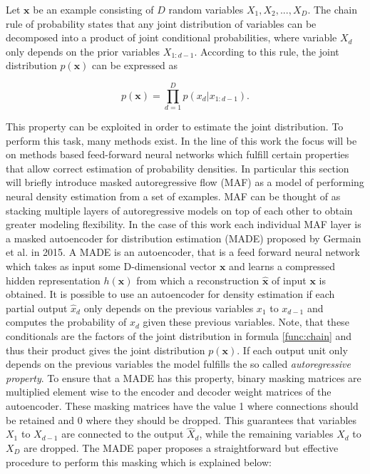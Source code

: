 \documentclass[11pt,titlepage,oneside,openany]{book}
\begin{document}
Let $\pmb{x}$ be an example consisting of $D$ random variables $X_1, X_2,...,X_D$. The chain rule of probability states that any joint distribution of variables can be decomposed into a product of joint conditional probabilities, where variable $X_d$ only depends on the prior variables $X_{1:d-1}$. According to this rule, the joint distribution $p(\pmb{x})$ can be expressed as

\begin{equation}
	\label{func:chain}
	p(\pmb{x}) = \prod_{d=1}^{D} p(x_d|x_{1:d-1}).
\end{equation}

\noindent This property can be exploited in order to estimate the joint distribution. To perform this task, many methods exist. In the line of this work the focus will be on methods based feed-forward neural networks which fulfill certain properties that allow correct estimation of probability densities. In particular this section will briefly introduce masked autoregressive flow (MAF) \cite{papamakarios_masked_2017} as a model of performing neural density estimation from a set of examples. MAF can be thought of as stacking multiple layers of autoregressive models on top of each other to obtain greater modeling flexibility. In the case of this work each individual MAF layer is a masked autoencoder for distribution estimation (MADE) \cite{germain_made_nodate} proposed by Germain et al. in 2015. A MADE is an autoencoder, that is a feed forward neural network which takes as input some D-dimensional vector $\pmb{x}$ and learns a compressed hidden representation $h(\pmb{x})$ from which a reconstruction $\hat{\pmb{x}}$ of input $\pmb{x}$ is obtained. It is possible to use an autoencoder for density estimation if each partial output $\hat{x}_d$ only depends on the previous variables $x_1$ to $x_{d-1}$ and computes the probability of $x_d$ given these previous variables. Note, that these conditionals are the factors of the joint distribution in formula \ref{func:chain} and thus their product gives the joint distribution $p(\pmb{x})$. If each output unit only depends on the previous variables the model fulfills the so called \emph{autoregressive property}. To ensure that a MADE has this property, binary masking matrices are multiplied element wise to the encoder and decoder weight matrices of the autoencoder. These masking matrices have the value 1 where connections should be retained and 0 where they should be dropped. This guarantees that variables $X_1$ to $X_{d-1}$ are connected to the output $\hat{X}_d$, while the remaining variables $X_d$ to $X_D$ are dropped. The MADE paper \cite{germain_made_nodate} proposes a straightforward but effective procedure to perform this masking which is explained below:
\end{document}
